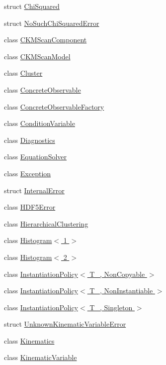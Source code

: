 \begin{DoxyCompactItemize}
struct \hyperlink{structeos_1_1ChiSquared}{ChiSquared}
\item 
struct \hyperlink{structeos_1_1NoSuchChiSquaredError}{NoSuchChiSquaredError}
\item 
class \hyperlink{classeos_1_1CKMScanComponent}{CKMScanComponent}
\item 
class \hyperlink{classeos_1_1CKMScanModel}{CKMScanModel}
\item 
class \hyperlink{classeos_1_1Cluster}{Cluster}
\item 
class \hyperlink{classeos_1_1ConcreteObservable}{ConcreteObservable}
\item 
class \hyperlink{classeos_1_1ConcreteObservableFactory}{ConcreteObservableFactory}
\item 
class \hyperlink{classeos_1_1ConditionVariable}{ConditionVariable}
\item 
class \hyperlink{classeos_1_1Diagnostics}{Diagnostics}
\item 
class \hyperlink{classeos_1_1EquationSolver}{EquationSolver}
\item 
class \hyperlink{classeos_1_1Exception}{Exception}
\item 
struct \hyperlink{structeos_1_1InternalError}{InternalError}
\item 
class \hyperlink{classeos_1_1HDF5Error}{HDF5Error}
\item 
class \hyperlink{classeos_1_1HierarchicalClustering}{HierarchicalClustering}
\item 
class \hyperlink{classeos_1_1Histogram_3_011_01_4}{Histogram$<$ 1 $>$}
\item 
class \hyperlink{classeos_1_1Histogram_3_012_01_4}{Histogram$<$ 2 $>$}
\item 
class \hyperlink{classeos_1_1InstantiationPolicy_3_01T___00_01NonCopyable_01_4}{InstantiationPolicy$<$ T\_\-, NonCopyable $>$}
\item 
class \hyperlink{classeos_1_1InstantiationPolicy_3_01T___00_01NonInstantiable_01_4}{InstantiationPolicy$<$ T\_\-, NonInstantiable $>$}
\item 
class \hyperlink{classeos_1_1InstantiationPolicy_3_01T___00_01Singleton_01_4}{InstantiationPolicy$<$ T\_\-, Singleton $>$}
\item 
struct \hyperlink{structeos_1_1UnknownKinematicVariableError}{UnknownKinematicVariableError}
\item 
class \hyperlink{classeos_1_1Kinematics}{Kinematics}
\item 
class \hyperlink{classeos_1_1KinematicVariable}{KinematicVariable}

\end{DoxyCompactItemize}
